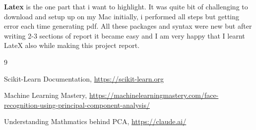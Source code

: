 \documentclass[12pt,a4paper]{article}
\begin{document}
\textbf{Latex} is the one part that i want to highlight. It was quite bit of challenging
to download and setup up on my Mac initially, i performed all steps but getting 
error each time generating pdf. All these packages and syntax were new but after writing
2-3 sections of report it became easy and I am very happy that I learnt LateX also 
while making this project report.


\begin{thebibliography}{9}


Scikit-Learn Documentation,
\url{https://scikit-learn.org}

Machine Learning Mastery,
\url{https://machinelearningmastery.com/face-recognition-using-principal-component-analysis/}

Understanding Mathmatics behind PCA,
\url{https://claude.ai/}
\end{thebibliography}
\end{document}
